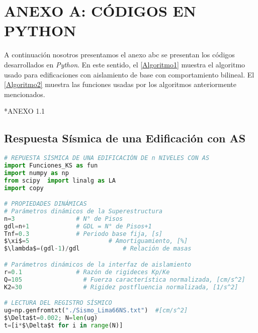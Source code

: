 \section*{ANEXO A: CÓDIGOS EN PYTHON}
{}
A continuación nosotros  presentamos el anexo abc se presentan los códigos desarrollados en \textit{Python}. En este sentido, el \autoref{Algoritmo1} muestra el algoritmo usado para edificaciones con aislamiento de base con comportamiento bilineal. El \autoref{Algoritmo2} muestra las funciones usadas por los algoritmos anteriormente mencionados.

\vspace*{2mm}

*ANEXO 1.1

\subsection*{Respuesta Sísmica de una Edificación con AS}
{}

\begin{MyFont}
\begin{adjustwidth}{4.8mm}{}
\begin{lstlisting}[language=Python, caption= {\footnotesize Edificación con aislamiento sísmico bilineal}, mathescape=true,label={Algoritmo1}]
# REPUESTA SÍSMICA DE UNA EDIFICACIÓN DE n NIVELES CON AS
import Funciones_KS as fun
import numpy as np
from scipy  import linalg as LA
import copy

# PROPIEDADES DINÁMICAS
# Parámetros dinámicos de la Superestructura
n=3                 # N° de Pisos
gdl=n+1             # GDL = N° de Pisos+1
Tnf=0.3             # Periodo base fija, [s]
$\xi$=5           			 # Amortiguamiento, [%]
$\lambda$=(gdl-1)/gdl 			 # Relación de masas

# Parámetros dinámicos de la interfaz de aislamiento
r=0.1               # Razón de rigideces Kp/Ke
Q=105          		  # Fuerza característica normalizada, [cm/s^2]
K2=30         		  # Rigidez postfluencia normalizada, [1/s^2]

# LECTURA DEL REGISTRO SÍSMICO
ug=np.genfromtxt("./Sismo_Lima66NS.txt")  #[cm/s^2]
$\Delta$t=0.002; N=len(ug)
t=[i*$\Delta$t for i in range(N)]

\end{lstlisting}
\end{adjustwidth}
\end{MyFont}

